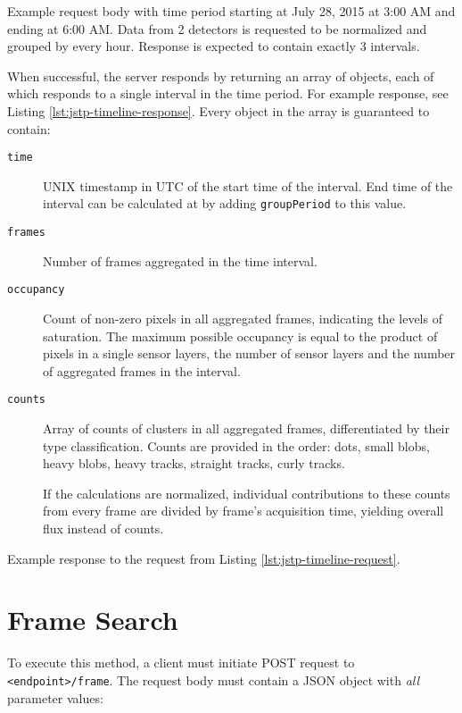 \begin{listing}
    \caption{Example request body with time period starting at July 28, 2015 at 3:00 AM and ending at 6:00 AM. Data from 2 detectors is requested to be normalized and grouped by every hour. Response is expected to contain exactly 3 intervals.}
    \label{lst:jstp-timeline-request}
\end{listing}

When successful, the server responds by returning an array of objects, each of which responds to a single interval in the time period. For example response, see Listing \ref{lst:jstp-timeline-response}. Every object in the array is guaranteed to contain:

\begin{description}
	\item[\texttt{time}]
	UNIX timestamp in UTC of the start time of the interval. End time of the interval can be calculated at by adding \texttt{groupPeriod} to this value.

	\item[\texttt{frames}]
	Number of frames aggregated in the time interval.
	
	\item[\texttt{occupancy}]
	Count of non-zero pixels in all aggregated frames, indicating the levels of saturation. The maximum possible occupancy is equal to the product of pixels in a single sensor layers, the number of sensor layers and the number of aggregated frames in the interval.
	
	\item[\texttt{counts}]
	Array of counts of clusters in all aggregated frames, differentiated by their type classification. Counts are provided in the order: dots, small blobs, heavy blobs, heavy tracks, straight tracks, curly tracks.

	If the calculations are normalized, individual contributions to these counts from every frame are divided by frame's acquisition time, yielding overall flux instead of counts.
\end{description}

\begin{listing}
    \caption{Example response to the request from Listing \ref{lst:jstp-timeline-request}.}
    \label{lst:jstp-timeline-response}
\end{listing}

\section{Frame Search}
\label{apx:jstp-frame}
To execute this method, a client must initiate POST request to \texttt{<endpoint>/frame}. The request body must contain a JSON object with \textit{all} parameter values:

